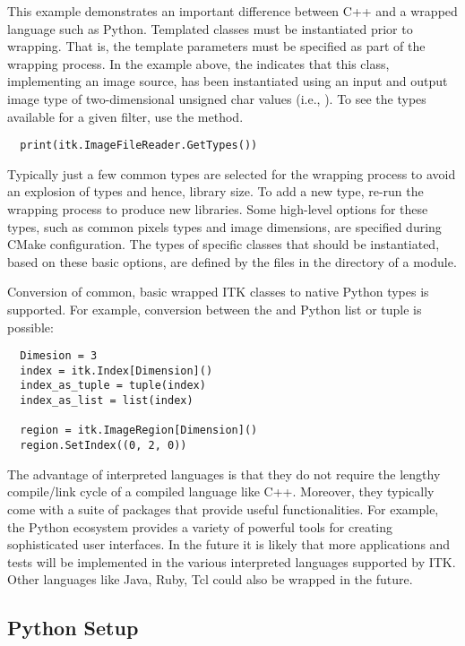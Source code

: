 This example demonstrates an important difference between C++ and a wrapped
language such as Python. Templated classes must be instantiated prior to
wrapping. That is, the template parameters must be specified as part of the
wrapping process. In the example above, the
 indicates that this class, implementing
an image source, has been
instantiated using an input and output image type of two-dimensional unsigned
char values (i.e., ). To see the types available for a given filter,
use the  method.

\small
\begin{verbatim}
  print(itk.ImageFileReader.GetTypes())
\end{verbatim}
\normalsize

Typically just a few common types are selected for the wrapping process to
avoid an explosion of types and hence, library size. To add a new type, re-run
the wrapping process to produce new libraries. Some high-level options for
these types, such as common pixels types and image dimensions, are specified
during CMake configuration.  The types of specific classes that should be
instantiated, based on these basic options, are defined by the 
files in the  directory of a module.

Conversion of common, basic wrapped ITK classes to native Python types is
supported. For example, conversion between the  and Python list
or tuple is possible:

\small
\begin{verbatim}
  Dimesion = 3
  index = itk.Index[Dimension]()
  index_as_tuple = tuple(index)
  index_as_list = list(index)

  region = itk.ImageRegion[Dimension]()
  region.SetIndex((0, 2, 0))
\end{verbatim}
\normalsize

The advantage of interpreted languages is that they do not require the lengthy
compile/link cycle of a compiled language like C++. Moreover, they typically
come with a suite of packages that provide useful functionalities. For example,
the Python ecosystem provides a variety of powerful tools for creating
sophisticated user interfaces. In the future it is likely that more
applications and tests will be implemented in the various interpreted
languages supported by ITK. Other languages like Java, Ruby, Tcl could also be
wrapped in the future.

\subsection{Python Setup}

